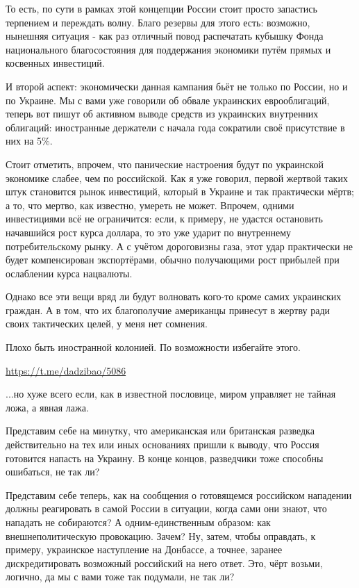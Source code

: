 То есть, по сути в рамках этой концепции России стоит просто запастись
терпением и переждать волну. Благо резервы для этого есть: возможно, нынешняя
ситуация - как раз отличный повод распечатать кубышку Фонда национального
благосостояния для поддержания экономики путём прямых и косвенных инвестиций.

И второй аспект: экономически данная кампания бьёт не только по России, но и по
Украине. Мы с вами уже говорили об обвале украинских еврооблигаций, теперь вот
пишут об активном выводе средств из украинских внутренних облигаций:
иностранные держатели с начала года сократили своё присутствие в них на 5\%. 

Стоит отметить, впрочем, что панические настроения будут по украинской
экономике слабее, чем по российской. Как я уже говорил, первой жертвой таких
штук становится рынок инвестиций, который в Украине и так практически мёртв; а
то, что мертво, как известно, умереть не может. Впрочем, одними инвестициями
всё не ограничится: если, к примеру, не удастся остановить начавшийся рост
курса доллара, то это уже ударит по внутреннему потребительскому рынку. А с
учётом дороговизны газа, этот удар практически не будет компенсирован
экспортёрами, обычно получающими рост прибылей при ослаблении курса нацвалюты. 

Однако все эти вещи вряд ли будут волновать кого-то кроме самих украинских
граждан. А в том, что их благополучие американцы принесут в жертву ради своих
тактических целей, у меня нет сомнения. 

Плохо быть иностранной колонией. По возможности избегайте этого.

\url{https://t.me/dadzibao/5086}

...но хуже всего если, как в известной пословице, миром управляет не тайная
ложа, а явная лажа.

Представим себе на минутку, что американская или британская разведка
действительно на тех или иных основаниях пришли к выводу, что Россия готовится
напасть на Украину. В конце концов, разведчики тоже способны ошибаться, не так
ли? 

Представим себе теперь, как на сообщения о готовящемся российском нападении
должны реагировать в самой России в ситуации, когда сами они знают, что
нападать не собираются? А одним-единственным образом: как внешнеполитическую
провокацию. Зачем? Ну, затем, чтобы оправдать, к примеру, украинское
наступление на Донбассе, а точнее, заранее дискредитировать возможный
российский на него ответ. Это, чёрт возьми, логично, да мы с вами тоже так
подумали, не так ли? 

